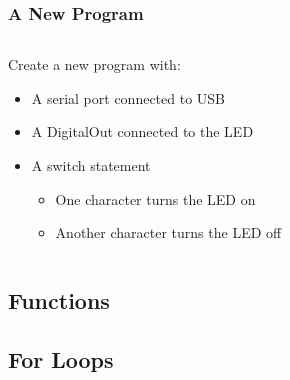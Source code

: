 \begin{frame}[fragile]
	\frametitle{A New Program}
	\begin{columns}[T]
		\begin{column}{0.5\textwidth}
			Create a new program with:
			\begin{itemize}
				\item A serial port connected to USB
				\item A DigitalOut connected to the LED
				\item A switch statement
				\begin{itemize}
					\item One character turns the LED on
					\item Another character turns the LED off
				\end{itemize}
			\end{itemize}
		\end{column}
		\begin{column}{0.5\textwidth}
			\pause
			
		\end{column}
	\end{columns}
\end{frame}

\subsection{Functions}
\label{sub:functions}


\subsection{For Loops}
\label{sub:for_loops}
